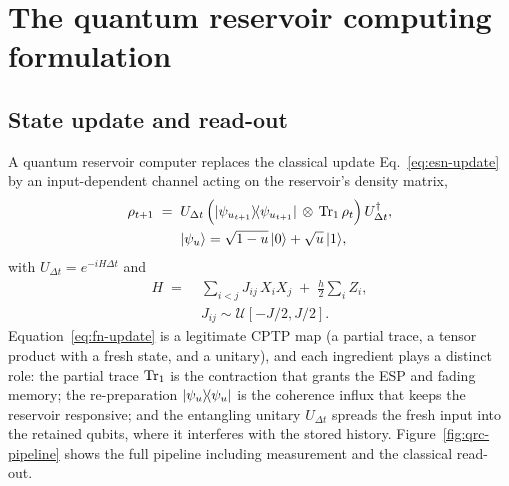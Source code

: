\section{The quantum reservoir computing formulation}
\label{sec:qrc-formulation}

\subsection{State update and read-out}
\label{sec:qrc-update}

A quantum reservoir computer replaces the classical update
Eq.~\eqref{eq:esn-update} by an input-dependent channel acting on the
reservoir's density matrix,
\begin{equation}
\begin{aligned}
  \rho_{t+1}
  \;=\;{}&
  U_{\Delta t}\,
  \Bigl( |\psi_{u_{t+1}}\rangle\!\langle\psi_{u_{t+1}}| \,\otimes\, \operatorname{Tr}_1 \rho_t \Bigr)\,
  U_{\Delta t}^\dagger,\\
  & |\psi_u\rangle = \sqrt{1-u}\,|0\rangle + \sqrt{u}\,|1\rangle,
\end{aligned}
  \label{eq:fn-update}
\end{equation}
with $U_{\Delta t} = e^{-iH\Delta t}$ and
\begin{equation}
\begin{aligned}
  H \;=\;{}& \sum_{i<j} J_{ij}\, X_i X_j \;+\; \tfrac{h}{2} \sum_i Z_i ,\\
  & J_{ij} \sim \mathcal{U}[-J/2, J/2].
\end{aligned}
  \label{eq:fn-hamiltonian}
\end{equation}
Equation~\eqref{eq:fn-update} is a legitimate CPTP map (a partial trace, a
tensor product with a fresh state, and a unitary), and each ingredient plays a
distinct role: the partial trace $\operatorname{Tr}_1$ is the contraction that grants the
ESP and fading memory; the re-preparation $|\psi_u\rangle\!\langle\psi_u|$ is the
coherence influx that keeps the reservoir responsive; and the entangling
unitary $U_{\Delta t}$ spreads the fresh input into the retained qubits, where
it interferes with the stored history. Figure~\ref{fig:qrc-pipeline} shows the
full pipeline including measurement and the classical read-out.

